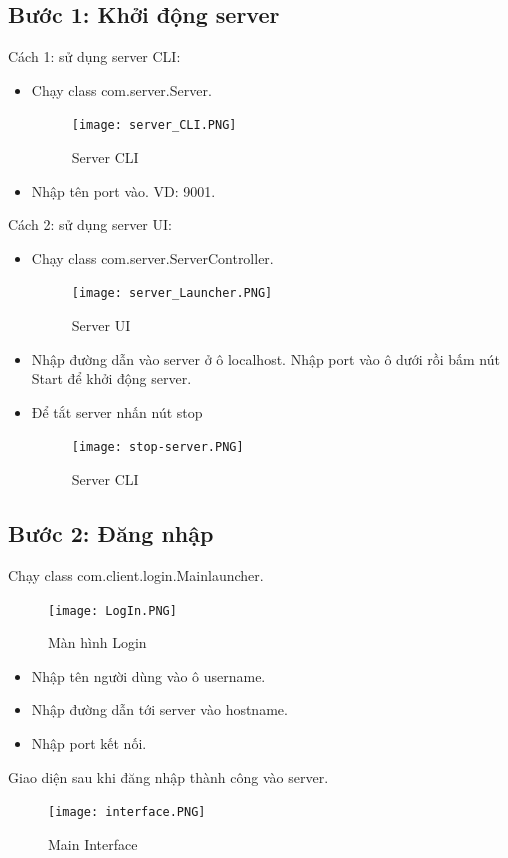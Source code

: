 \documentclass[a4paper]{article}
\begin{document}
	    \subsection{Bước 1: Khởi động server}
	Cách 1: sử dụng server CLI:
	\begin{itemize}
		\item Chạy class com.server.Server.
		\newline
		\begin{figure}[H]
			\centering
			\texttt{[image: server\_CLI.PNG]}
			\caption{Server CLI}
			\label{fig:my_label}
		\end{figure}
		\item Nhập tên port vào. VD: 9001.
	\end{itemize}
	Cách 2: sử dụng server UI:
	\begin{itemize}
		\item Chạy class com.server.ServerController.
		\newline
		\begin{figure}[H]
			\centering
			\texttt{[image: server\_Launcher.PNG]}
			\caption{Server UI}
			\label{fig:my_label}
		\end{figure}
		\item Nhập đường dẫn vào server ở ô localhost. Nhập port vào ô dưới rồi bấm nút Start để khởi động server.
		\item Để tắt server nhấn nút stop
		\begin{figure}[H]
			\centering
			\texttt{[image: stop-server.PNG]}
			\caption{Server CLI}
			\label{fig:my_label}
		\end{figure}
	\end{itemize}
	\subsection{Bước 2: Đăng nhập}
	Chạy class com.client.login.Mainlauncher.
	\newline
	\begin{figure}[H]
		\centering
		\texttt{[image: LogIn.PNG]}
		\caption{Màn hình Login}
		\label{fig:my_label}
	\end{figure}
	
	\begin{itemize}
		\item Nhập tên người dùng vào ô username.
		\item Nhập đường dẫn tới server vào hostname.
		\item Nhập port kết nối.
	\end{itemize}
	Giao diện sau khi đăng nhập thành công vào server.
	\begin{figure}[H]
		\centering
		\texttt{[image: interface.PNG]}
		\caption{Main Interface}
		\label{fig:my_label}
	\end{figure}
\end{document}
